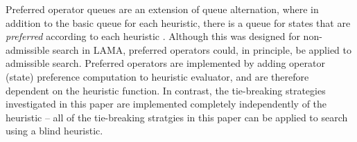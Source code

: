Preferred operator queues are an extension of queue alternation, where in addition to the basic queue for each heuristic, there is a queue for states that are \emph{preferred} according to each heuristic \cite{richter2010lama}.
Although this was designed for non-admissible search in LAMA, preferred operators could, in principle, be applied to admissible search. 
Preferred operators are implemented by adding operator (state) preference computation to heuristic evaluator, and are therefore dependent on the heuristic function.
In contrast, the tie-breaking strategies investigated in this paper are implemented completely independently of the heuristic -- all of the tie-breaking stratgies in this paper can be applied to search using a blind heuristic.


